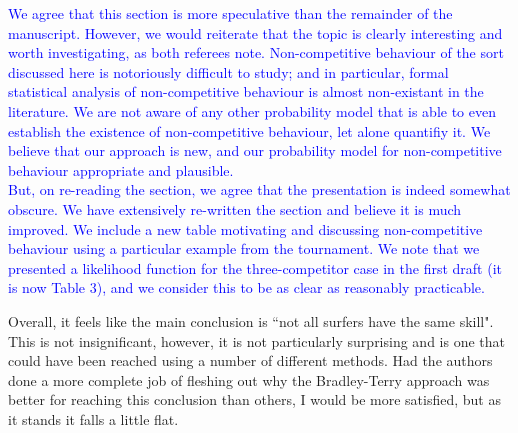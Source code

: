 \documentclass[12pt]{article}
\begin{document}
\textcolor{blue}{We agree that this section is more speculative than
  the remainder of the manuscript.  However, we would reiterate that
  the topic is clearly interesting and worth investigating, as both
  referees note.  Non-competitive behaviour of the sort discussed here
  is notoriously difficult to study; and in particular, formal
  statistical analysis of non-competitive behaviour is almost
  non-existant in the literature.  We are not aware of any other
  probability model that is able to even establish the existence of
  non-competitive behaviour, let alone quantifiy it.  We believe that
  our approach is new, and our probability model for non-competitive
  behaviour appropriate and plausible.\\ But, on re-reading the
  section, we agree that the presentation is indeed somewhat obscure.
  We have extensively re-written the section and believe it is much
  improved.  We include a new table motivating and discussing
  non-competitive behaviour using a particular example from the
  tournament.  We note that we presented a likelihood function for the
  three-competitor case in the first draft (it is now Table 3), and we
  consider this to be as clear as reasonably practicable.}

Overall, it feels like the main conclusion is ``not all surfers have
the same skill". This is not insignificant, however, it is not
particularly surprising and is one that could have been reached using
a number of different methods. Had the authors done a more complete
job of fleshing out why the Bradley-Terry approach was better for
reaching this conclusion than others, I would be more satisfied, but
as it stands it falls a little flat.
\end{document}
